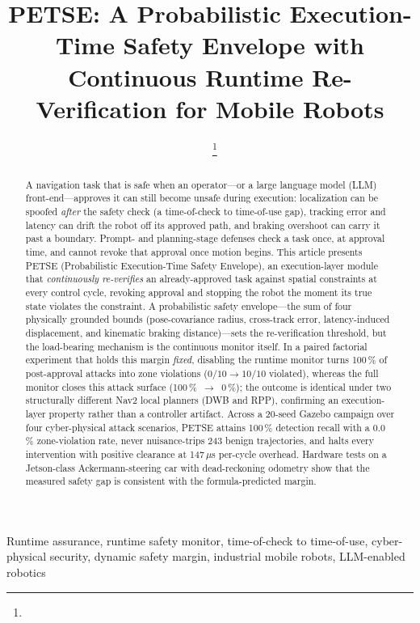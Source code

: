 \documentclass[journal,twoside,web]{ieeecolor}
\begin{document}
\title{PETSE: A Probabilistic Execution-Time Safety Envelope with Continuous Runtime Re-Verification for Mobile Robots}

\author{~
\thanks{}}

\maketitle

\begin{abstract}
A navigation task that is safe when an operator---or a large language model (LLM) front-end---approves it can still become unsafe during execution: localization can be spoofed \emph{after} the safety check (a time-of-check to time-of-use gap), tracking error and latency can drift the robot off its approved path, and braking overshoot can carry it past a boundary. Prompt- and planning-stage defenses check a task once, at approval time, and cannot revoke that approval once motion begins. This article presents PETSE (Probabilistic Execution-Time Safety Envelope), an execution-layer module that \emph{continuously re-verifies} an already-approved task against spatial constraints at every control cycle, revoking approval and stopping the robot the moment its true state violates the constraint. A probabilistic safety envelope---the sum of four physically grounded bounds (pose-covariance radius, cross-track error, latency-induced displacement, and kinematic braking distance)---sets the re-verification threshold, but the load-bearing mechanism is the continuous monitor itself. In a paired factorial experiment that holds this margin \emph{fixed}, disabling the runtime monitor turns 100\,\% of post-approval attacks into zone violations ($0/10 \rightarrow 10/10$ violated), whereas the full monitor closes this attack surface (100\,\%~$\rightarrow$~0\,\%); the outcome is identical under two structurally different Nav2 local planners (DWB and RPP), confirming an execution-layer property rather than a controller artifact. Across a 20-seed Gazebo campaign over four cyber-physical attack scenarios, PETSE attains 100\,\% detection recall with a 0.0\,\% zone-violation rate, never nuisance-trips 243 benign trajectories, and halts every intervention with positive clearance at 147\,$\mu$s per-cycle overhead. Hardware tests on a Jetson-class Ackermann-steering car with dead-reckoning odometry show that the measured safety gap is consistent with the formula-predicted margin.
\end{abstract}

\begin{IEEEkeywords}
Runtime assurance, runtime safety monitor, time-of-check to time-of-use, cyber-physical security, dynamic safety margin, industrial mobile robots, LLM-enabled robotics
\end{IEEEkeywords}
\end{document}
